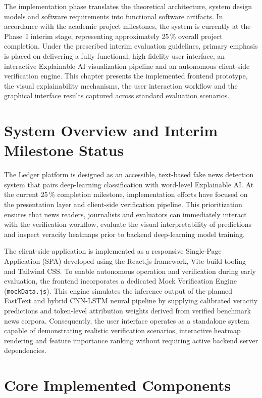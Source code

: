 \documentclass[12pt,a4paper,oneside]{report}
\begin{document}
The implementation phase translates the theoretical architecture, system design models
and software requirements into functional software artifacts. In accordance with the
academic project milestones, the system is currently at the Phase~I interim stage,
representing approximately 25\,\% overall project completion. Under the prescribed
interim evaluation guidelines, primary emphasis is placed on delivering a fully functional,
high-fidelity user interface, an interactive Explainable AI visualization pipeline and an
autonomous client-side verification engine. This chapter presents the implemented frontend
prototype, the visual explainability mechanisms, the user interaction workflow and the
graphical interface results captured across standard evaluation scenarios.

\section{System Overview and Interim Milestone Status}

The Ledger platform is designed as an accessible, text-based fake news detection system
that pairs deep-learning classification with word-level Explainable AI. At the current
25\,\% completion milestone, implementation efforts have focused on the presentation
layer and client-side verification pipeline. This prioritization ensures that news readers,
journalists and evaluators can immediately interact with the verification workflow, evaluate
the visual interpretability of predictions and inspect veracity heatmaps prior to backend
deep-learning model training.

The client-side application is implemented as a responsive Single-Page Application (SPA)
developed using the React.js framework, Vite build tooling and Tailwind CSS. To enable
autonomous operation and verification during early evaluation, the frontend incorporates
a dedicated Mock Verification Engine (\texttt{mockData.js}). This engine simulates the
inference output of the planned FastText and hybrid CNN-LSTM neural pipeline by supplying
calibrated veracity predictions and token-level attribution weights derived from verified
benchmark news corpora. Consequently, the user interface operates as a standalone system
capable of demonstrating realistic verification scenarios, interactive heatmap rendering
and feature importance ranking without requiring active backend server dependencies.

\section{Core Implemented Components}
\end{document}
